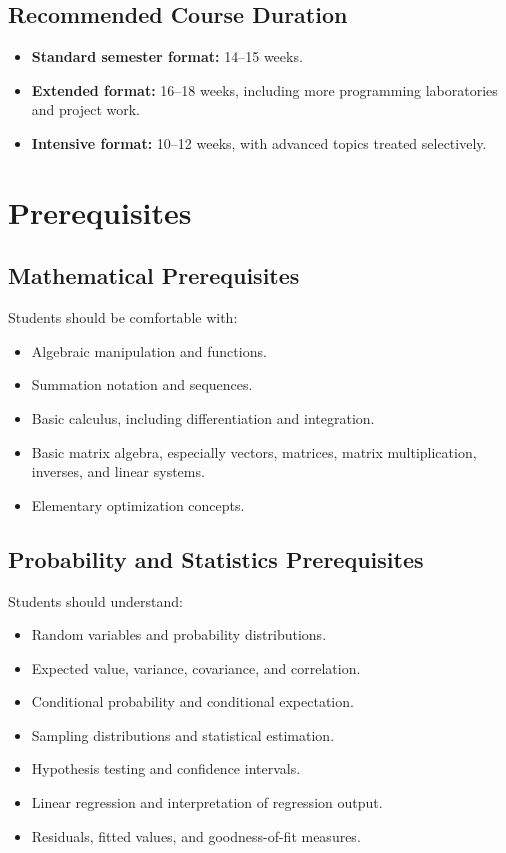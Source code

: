 \documentclass[11pt]{article}
\begin{document}
\subsection{Recommended Course Duration}

\begin{itemize}
    \item \textbf{Standard semester format:} 14--15 weeks.
    \item \textbf{Extended format:} 16--18 weeks, including more programming laboratories and project work.
    \item \textbf{Intensive format:} 10--12 weeks, with advanced topics treated selectively.
\end{itemize}

\section{Prerequisites}

\subsection{Mathematical Prerequisites}

Students should be comfortable with:
\begin{itemize}
    \item Algebraic manipulation and functions.
    \item Summation notation and sequences.
    \item Basic calculus, including differentiation and integration.
    \item Basic matrix algebra, especially vectors, matrices, matrix multiplication, inverses, and linear systems.
    \item Elementary optimization concepts.
\end{itemize}

\subsection{Probability and Statistics Prerequisites}

Students should understand:
\begin{itemize}
    \item Random variables and probability distributions.
    \item Expected value, variance, covariance, and correlation.
    \item Conditional probability and conditional expectation.
    \item Sampling distributions and statistical estimation.
    \item Hypothesis testing and confidence intervals.
    \item Linear regression and interpretation of regression output.
    \item Residuals, fitted values, and goodness-of-fit measures.
\end{itemize}
\end{document}
